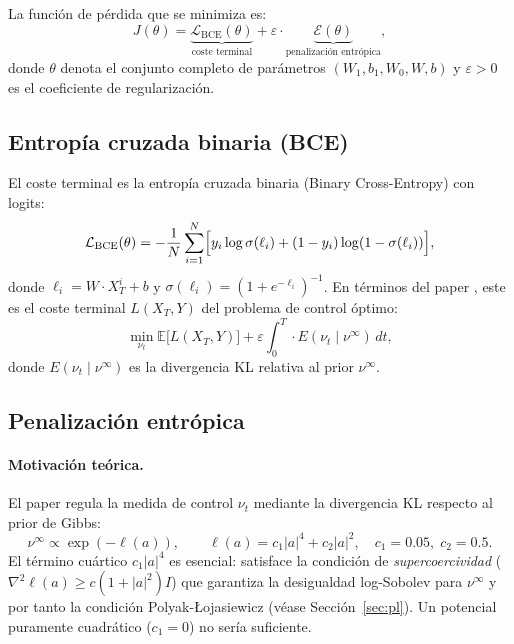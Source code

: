 \documentclass[11pt, a4paper]{article}
\theoremstyle{definition}
\newcommand{\E}{\mathbb{E}}
\newcommand{\abs}[1]{\left|#1\right|}
\newcommand{\eps}{\varepsilon}
\begin{document}
La función de pérdida que se minimiza es:
\begin{equation}
  \label{eq:loss}
  J(\theta) = \underbrace{\mathcal{L}_{\text{BCE}}(\theta)}_{\text{coste terminal}}
            + \varepsilon \cdot \underbrace{\mathcal{E}(\theta)}_{\text{penalización entrópica}},
\end{equation}
donde $\theta$ denota el conjunto completo de parámetros
$(W_1, b_1, W_0, W, b)$ y $\varepsilon > 0$ es el coeficiente de
regularización.

\subsection{Entropía cruzada binaria (BCE)}
\label{sec:bce}

El coste terminal es la entropía cruzada binaria (Binary Cross-Entropy) con
logits:
\begin{equation}
  \label{eq:bce}
  \mathcal{L}_{\text{BCE}}(\theta)
  = -\frac{1}{N}\sum_{i=1}^{N}
    \Bigl[ y_i \log \sigma(\ell_i) + (1 - y_i)\log(1 - \sigma(\ell_i)) \Bigr],
\end{equation}
donde $\ell_i = W \cdot X_T^{i} + b$ y $\sigma(\ell_i) = (1 + e^{-\ell_i})^{-1}$.
En términos del paper \cite{daudin2025}, este es el coste terminal
$L(X_T, Y)$ del problema de control óptimo:
\begin{equation}
  \min_{\nu_t} \E\bigl[L(X_T, Y)\bigr] + 
  \eps \int_0^T \cdot E(\nu_t \mid \nu^\infty)\,dt,
\end{equation}
donde $E(\nu_t \mid \nu^\infty)$ es la divergencia KL relativa al prior
$\nu^\infty$.

\subsection{Penalización entrópica}
\label{sec:entropica}

\paragraph{Motivación teórica.}
El paper regula la medida de control $\nu_t$ mediante la divergencia KL
respecto al prior de Gibbs:
\begin{equation}
  \nu^\infty \propto \exp(-\ell(a)), \qquad
  \ell(a) = c_1 \abs{a}^4 + c_2 \abs{a}^2,
  \quad c_1 = 0.05,\; c_2 = 0.5.
\end{equation}
El término cuártico $c_1 \abs{a}^4$ es esencial: satisface la condición de
\emph{supercoercividad} ($\nabla^2 \ell(a) \geq c(1 + \abs{a}^2)I$) que
garantiza la desigualdad log-Sobolev para $\nu^\infty$ y por tanto la
condición Polyak-Łojasiewicz (véase Sección~\ref{sec:pl}).
Un potencial puramente cuadrático ($c_1 = 0$) no sería suficiente.
\end{document}
